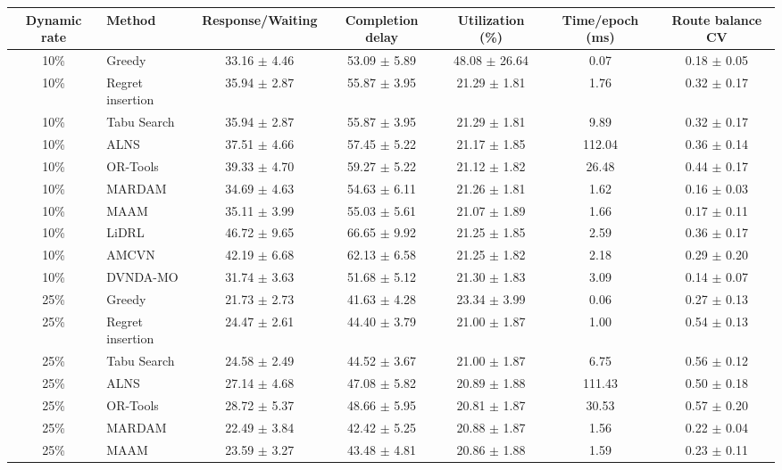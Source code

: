 \begin{tabular}{clccccc}
\toprule
Dynamic rate & Method & Response/Waiting & Completion delay & Utilization (\%) & Time/epoch (ms) & Route balance CV \\
\midrule
10\% & Greedy & 33.16 $\pm$ 4.46 & 53.09 $\pm$ 5.89 & 48.08 $\pm$ 26.64 & 0.07 & 0.18 $\pm$ 0.05 \\
10\% & Regret insertion & 35.94 $\pm$ 2.87 & 55.87 $\pm$ 3.95 & 21.29 $\pm$ 1.81 & 1.76 & 0.32 $\pm$ 0.17 \\
10\% & Tabu Search & 35.94 $\pm$ 2.87 & 55.87 $\pm$ 3.95 & 21.29 $\pm$ 1.81 & 9.89 & 0.32 $\pm$ 0.17 \\
10\% & ALNS & 37.51 $\pm$ 4.66 & 57.45 $\pm$ 5.22 & 21.17 $\pm$ 1.85 & 112.04 & 0.36 $\pm$ 0.14 \\
10\% & OR-Tools & 39.33 $\pm$ 4.70 & 59.27 $\pm$ 5.22 & 21.12 $\pm$ 1.82 & 26.48 & 0.44 $\pm$ 0.17 \\
10\% & MARDAM & 34.69 $\pm$ 4.63 & 54.63 $\pm$ 6.11 & 21.26 $\pm$ 1.81 & 1.62 & 0.16 $\pm$ 0.03 \\
10\% & MAAM & 35.11 $\pm$ 3.99 & 55.03 $\pm$ 5.61 & 21.07 $\pm$ 1.89 & 1.66 & 0.17 $\pm$ 0.11 \\
10\% & LiDRL & 46.72 $\pm$ 9.65 & 66.65 $\pm$ 9.92 & 21.25 $\pm$ 1.85 & 2.59 & 0.36 $\pm$ 0.17 \\
10\% & AMCVN & 42.19 $\pm$ 6.68 & 62.13 $\pm$ 6.58 & 21.25 $\pm$ 1.82 & 2.18 & 0.29 $\pm$ 0.20 \\
10\% & DVNDA-MO & 31.74 $\pm$ 3.63 & 51.68 $\pm$ 5.12 & 21.30 $\pm$ 1.83 & 3.09 & 0.14 $\pm$ 0.07 \\
25\% & Greedy & 21.73 $\pm$ 2.73 & 41.63 $\pm$ 4.28 & 23.34 $\pm$ 3.99 & 0.06 & 0.27 $\pm$ 0.13 \\
25\% & Regret insertion & 24.47 $\pm$ 2.61 & 44.40 $\pm$ 3.79 & 21.00 $\pm$ 1.87 & 1.00 & 0.54 $\pm$ 0.13 \\
25\% & Tabu Search & 24.58 $\pm$ 2.49 & 44.52 $\pm$ 3.67 & 21.00 $\pm$ 1.87 & 6.75 & 0.56 $\pm$ 0.12 \\
25\% & ALNS & 27.14 $\pm$ 4.68 & 47.08 $\pm$ 5.82 & 20.89 $\pm$ 1.88 & 111.43 & 0.50 $\pm$ 0.18 \\
25\% & OR-Tools & 28.72 $\pm$ 5.37 & 48.66 $\pm$ 5.95 & 20.81 $\pm$ 1.87 & 30.53 & 0.57 $\pm$ 0.20 \\
25\% & MARDAM & 22.49 $\pm$ 3.84 & 42.42 $\pm$ 5.25 & 20.88 $\pm$ 1.87 & 1.56 & 0.22 $\pm$ 0.04 \\
25\% & MAAM & 23.59 $\pm$ 3.27 & 43.48 $\pm$ 4.81 & 20.86 $\pm$ 1.88 & 1.59 & 0.23 $\pm$ 0.11 \\

\end{tabular}
